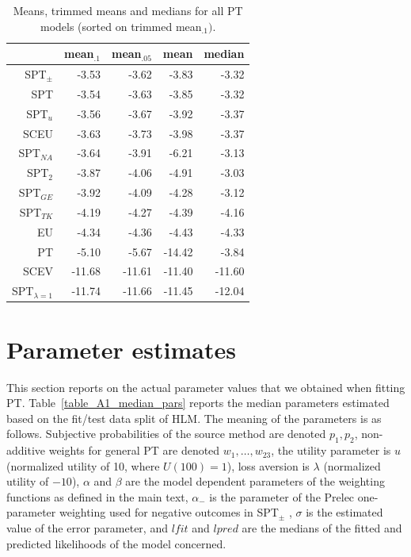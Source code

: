 \documentclass[11pt, a4paper, oneside,final,notitlepage,onecolumn]{article}\usepackage[]{graphicx}\usepackage[]{color}
\newcounter{sectio}
\begin{document}
\begin{table}[!htb]
\centering
\begin{tabular}{rrrrr}
  \hline
 & mean$_{.1}$ & mean$_{.05}$ & mean & median \\ 
  \hline
SPT$_{\pm}$ & -3.53 & -3.62 & -3.83 & -3.32 \\ 
  SPT & -3.54 & -3.63 & -3.85 & -3.32 \\ 
  SPT$_{u}$ & -3.56 & -3.67 & -3.92 & -3.37 \\ 
  SCEU & -3.63 & -3.73 & -3.98 & -3.37 \\ 
  SPT$_{NA}$ & -3.64 & -3.91 & -6.21 & -3.13 \\ 
  SPT$_{2}$ & -3.87 & -4.06 & -4.91 & -3.03 \\ 
  SPT$_{GE}$ & -3.92 & -4.09 & -4.28 & -3.12 \\ 
  SPT$_{TK}$ & -4.19 & -4.27 & -4.39 & -4.16 \\ 
  EU & -4.34 & -4.36 & -4.43 & -4.33 \\ 
  PT & -5.10 & -5.67 & -14.42 & -3.84 \\ 
  SCEV & -11.68 & -11.61 & -11.40 & -11.60 \\ 
  SPT$_{\lambda = 1}$ & -11.74 & -11.66 & -11.45 & -12.04 \\ 
   \hline
\end{tabular}
\caption{Means, trimmed means and medians for all PT models (sorted on trimmed mean$_{.1})$.} 
\label{table_means_PT_models}
\end{table}



\section{Parameter estimates}
\label{sec:indiv-param}

This section reports on the actual parameter values that we obtained when fitting PT.
Table~\ref{table_A1_median_pars} reports the median parameters estimated based on the fit/test data split of HLM. The meaning of the parameters is as follows. Subjective probabilities of the source method are denoted $p_{1}, p_{2}$, non-additive weights for general PT are denoted $w_{1}, \ldots, w_{23}$, the utility parameter is $u$ (normalized utility of 10, where $U(100)=1$), loss aversion is $\lambda$ (normalized utility of $-10$), $\alpha$ and $\beta$ are the model dependent parameters of the weighting functions as defined in the main text, $\alpha_{-}$ is the parameter of the Prelec one-parameter weighting used for negative outcomes in SPT$_{\pm}$ 
, $\sigma$ is the estimated value of the error parameter, and $lfit$ and $lpred$ are the medians of the fitted and predicted likelihoods of the model concerned.
\end{document}
